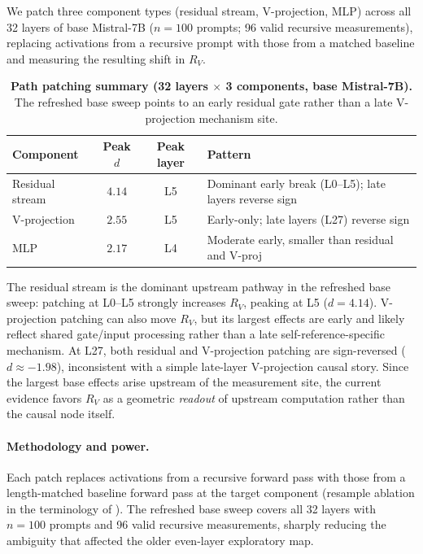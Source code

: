 \documentclass{article}
\newcommand{\RV}{R_V}
\newcommand{\dcohen}{d}
\begin{document}
We patch three component types (residual stream, V-projection, MLP) across all
32 layers of base Mistral-7B ($n = 100$ prompts; 96 valid recursive measurements), replacing activations
from a recursive prompt with those from a matched baseline and measuring the resulting shift in $\RV$.

\begin{table}[ht]
\centering
\caption{\textbf{Path patching summary (32 layers $\times$ 3 components, base Mistral-7B).}
         The refreshed base sweep points to an early residual gate rather than a late V-projection mechanism site.}
\label{tab:pathpatch}
\smallskip
\begin{tabular}{lccp{5.5cm}}
\toprule
\textbf{Component} & \textbf{Peak $\dcohen$} & \textbf{Peak layer} & \textbf{Pattern} \\
\midrule
Residual stream & $4.14$ & L5 & Dominant early break (L0--L5); late layers reverse sign \\
V-projection    & $2.55$ & L5 & Early-only; late layers (L27) reverse sign \\
MLP             & $2.17$ & L4 & Moderate early, smaller than residual and V-proj \\
\bottomrule
\end{tabular}
\end{table}

The residual stream is the dominant upstream pathway in the refreshed base sweep:
patching at L0--L5 strongly increases $\RV$, peaking at L5 ($\dcohen = 4.14$).
V-projection patching can also move $\RV$, but its largest effects are early and likely reflect
shared gate/input processing rather than a late self-reference-specific mechanism.
At L27, both residual and V-projection patching are sign-reversed ($\dcohen \approx -1.98$),
inconsistent with a simple late-layer V-projection causal story.
Since the largest base effects arise upstream of the measurement site, the current evidence favors
$\RV$ as a geometric \emph{readout} of upstream computation rather than the causal node itself.

\paragraph{Methodology and power.}
Each patch replaces activations from a recursive forward pass with those from a
length-matched baseline forward pass at the target component (resample ablation in the
terminology of \citet{heimersheim2024activation}).
The refreshed base sweep covers all 32 layers with $n = 100$ prompts and 96 valid recursive
measurements, sharply reducing the ambiguity that affected the older even-layer exploratory map.
\end{document}
